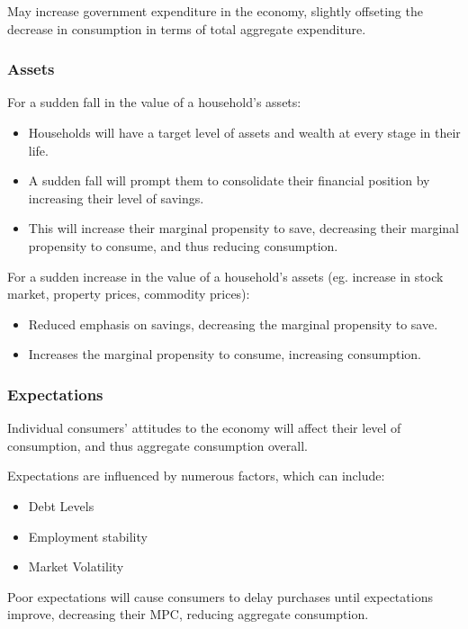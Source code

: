\documentclass[a4paper,11pt]{report}
\begin{document}
May increase government expenditure in the economy, slightly offseting the
decrease in consumption in terms of total aggregate expenditure.

\subsubsection{Assets}

For a sudden fall in the value of a household's assets:

\begin{itemize}
\item Households will have a target level of assets and wealth at every stage
	in their life.
\item A sudden fall will prompt them to consolidate their financial position by
	increasing their level of savings.
\item This will increase their marginal propensity to save, decreasing their
	marginal propensity to consume, and thus reducing consumption.
\end{itemize}

For a sudden increase in the value of a household's assets (eg. increase in
stock market, property prices, commodity prices):

\begin{itemize}
\item Reduced emphasis on savings, decreasing the marginal propensity to save.
\item Increases the marginal propensity to consume, increasing consumption.
\end{itemize}

\subsubsection{Expectations}

Individual consumers' attitudes to the economy will affect their level of
consumption, and thus aggregate consumption overall.

Expectations are influenced by numerous factors, which can include:

\begin{itemize}
\item Debt Levels
\item Employment stability
\item Market Volatility
\end{itemize}

Poor expectations will cause consumers to delay purchases until expectations
improve, decreasing their MPC, reducing aggregate consumption.
\end{document}
